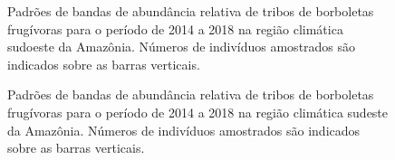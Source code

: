 \documentclass[
  letterpaper,
]{scrbook}
\begin{document}
\begin{figure}[H]


\caption{\label{fig-regiao-climatica-sudoeste-amazonica}Padrões de
bandas de abundância relativa de tribos de borboletas frugívoras para o
período de 2014 a 2018 na região climática sudoeste da Amazônia. Números
de indivíduos amostrados são indicados sobre as barras verticais.}

\end{figure}%

\begin{figure}[H]


\caption{\label{fig-regiao-climatica-sudeste-amazonica}Padrões de bandas
de abundância relativa de tribos de borboletas frugívoras para o período
de 2014 a 2018 na região climática sudeste da Amazônia. Números de
indivíduos amostrados são indicados sobre as barras verticais.}

\end{figure}%
\end{document}
